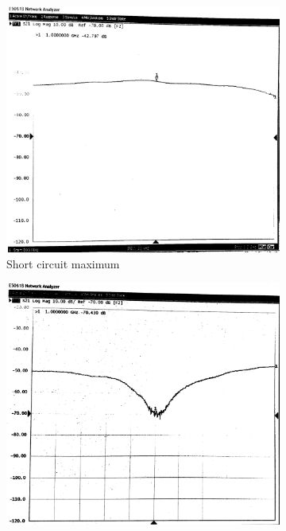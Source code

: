 \documentclass[10pt]{article}
\begin{document}
\begin{figure}[ht]
    \centering
    \begin{subfigure}[b]{0.45\textwidth}
        \includegraphics[width=\textwidth]{../photos/lab2/short-cir-peak.jpg}
        \caption{Short circuit maximum}
    \end{subfigure}
    \quad
    \begin{subfigure}[b]{0.45\textwidth}
        \includegraphics[width=\textwidth]{../photos/lab2/short-cir-valley.jpg}

\end{subfigure}
\end{figure}
\end{document}
